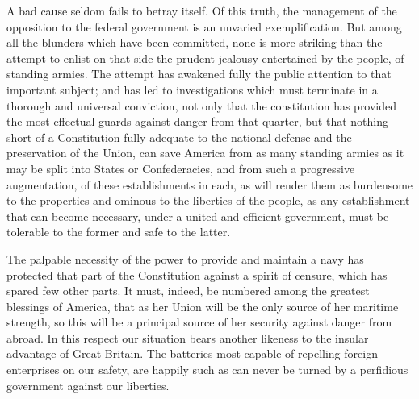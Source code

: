 A bad cause seldom fails to betray itself. 
Of this truth, the management of the opposition to the federal government is an unvaried exemplification. 
But among all the blunders which have been committed, none is more striking than the attempt to enlist on that side the prudent jealousy entertained by the people, of standing armies. 
The attempt has awakened fully the public attention to that important subject; and has led to investigations which must terminate in a thorough and universal conviction, not only that the constitution has provided the most effectual guards against danger from that quarter, but that nothing short of a Constitution fully adequate to the national defense and the preservation of the Union, can save America from as many standing armies as it may be split into States or Confederacies, and from such a progressive augmentation, of these establishments in each, as will render them as burdensome to the properties and ominous to the liberties of the people, as any establishment that can become necessary, under a united and efficient government, must be tolerable to the former and safe to the latter.

The palpable necessity of the power to provide and maintain a navy has protected that part of the Constitution against a spirit of censure, which has spared few other parts. 
It must, indeed, be numbered among the greatest blessings of America, that as her Union will be the only source of her maritime strength, so this will be a principal source of her security against danger from abroad. 
In this respect our situation bears another likeness to the insular advantage of Great Britain. 
The batteries most capable of repelling foreign enterprises on our safety, are happily such as can never be turned by a perfidious government against our liberties.

